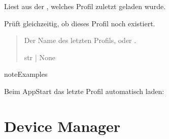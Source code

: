 \documentclass[letterpaper,10pt,english]{sphinxmanual}
\begin{document}
\begin{fulllineitems}
\begin{fulllineitems}
\label{\detokenize{modulab/profile_manager:modules.profile.ProfileManager.ProfileManager.get_last_profile_name}}
\pysigstartsignatures
\pysiglinewithargsret
{}
{}
{}
\pysigstopsignatures
\sphinxAtStartPar
Liest aus der , welches Profil zuletzt geladen wurde.

\sphinxAtStartPar
Prüft gleichzeitig, ob dieses Profil noch existiert.
\begin{quote}\begin{description}
\sphinxAtStartPar
Der Name des letzten Profils, oder .

\sphinxAtStartPar
str | None

\end{description}\end{quote}

\begin{sphinxadmonition}{note}{Examples}

\sphinxAtStartPar
Beim App\sphinxhyphen{}Start das letzte Profil automatisch laden:

\begin{sphinxVerbatim}[commandchars=\\\{\}]
  
 
\end{sphinxVerbatim}
\end{sphinxadmonition}

\end{fulllineitems}


\end{fulllineitems}


\sphinxstepscope


\chapter{Device Manager}
\label{\detokenize{modulab/device_manager:module-modules.device.DeviceManager}}\label{\detokenize{modulab/device_manager:id1}}\label{\detokenize{modulab/device_manager:device-manager}}\label{\detokenize{modulab/device_manager::doc}}
\end{document}
